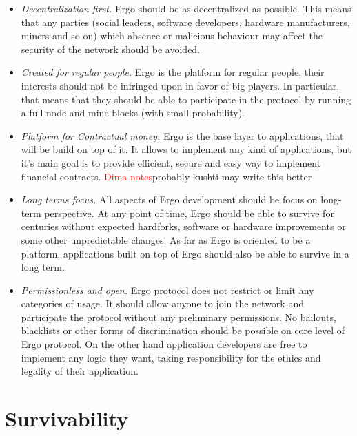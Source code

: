 \documentclass[]{article}
\newcommand{\dnote}[1]{{\textcolor{red}{Dima notes}}{#1}}
\newcommand{\Ergo}{Ergo}
\begin{document}
    \begin{itemize}
        \item{\em Decentralization first.} \Ergo{} should be as decentralized as possible.
        This means that any parties (social leaders, software developers, hardware manufacturers, miners and so on)
        which absence or malicious behaviour may affect the security of the network should be avoided.
        \item{\em Created for regular people.} \Ergo{} is the platform for regular people, their interests should
        not be infringed upon in favor of big players. In particular, that means that they should be able to
        participate in the protocol by running a full node and mine blocks (with small probability).
        \item{\em Platform for Contractual money.} \Ergo{} is the base layer to applications, that will be
        build on top of it. It allows to implement any kind of applications, but it's main goal is
        to provide efficient, secure and easy way to implement financial contracts. \dnote{probably kushti may write this better}
        \item{\em Long terms focus.} All aspects of \Ergo{} development should be focus on long-term perspective.
        At any point of time, \Ergo{} should be able to survive for centuries without expected hardforks,
        software or hardware improvements or some other unpredictable changes. As far as \Ergo{} is oriented
        to be a platform, applications built on top of \Ergo{} should also be able to survive in a long term.
        \item{\em Permissionless and open.} \Ergo{} protocol does not restrict or limit any categories of usage.
        It should allow anyone to join the network and participate the protocol without any preliminary permissions.
        No bailouts, blacklists or other forms of discrimination should be possible on core level of \Ergo{} protocol.
        On the other hand application developers are free to implement any logic they want, taking responsibility
        for the ethics and legality of their application.
    \end{itemize}


    \section{Survivability}

\end{document}
